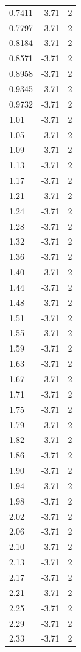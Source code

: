 \begin{longtable}{lrr}
  0.7411 & -3.71 & 2 \\
  0.7797 & -3.71 & 2 \\
  0.8184 & -3.71 & 2 \\
  0.8571 & -3.71 & 2 \\
  0.8958 & -3.71 & 2 \\
  0.9345 & -3.71 & 2 \\
  0.9732 & -3.71 & 2 \\
  1.01 & -3.71 & 2 \\
  1.05 & -3.71 & 2 \\
  1.09 & -3.71 & 2 \\
  1.13 & -3.71 & 2 \\
  1.17 & -3.71 & 2 \\
  1.21 & -3.71 & 2 \\
  1.24 & -3.71 & 2 \\
  1.28 & -3.71 & 2 \\
  1.32 & -3.71 & 2 \\
  1.36 & -3.71 & 2 \\
  1.40 & -3.71 & 2 \\
  1.44 & -3.71 & 2 \\
  1.48 & -3.71 & 2 \\
  1.51 & -3.71 & 2 \\
  1.55 & -3.71 & 2 \\
  1.59 & -3.71 & 2 \\
  1.63 & -3.71 & 2 \\
  1.67 & -3.71 & 2 \\
  1.71 & -3.71 & 2 \\
  1.75 & -3.71 & 2 \\
  1.79 & -3.71 & 2 \\
  1.82 & -3.71 & 2 \\
  1.86 & -3.71 & 2 \\
  1.90 & -3.71 & 2 \\
  1.94 & -3.71 & 2 \\
  1.98 & -3.71 & 2 \\
  2.02 & -3.71 & 2 \\
  2.06 & -3.71 & 2 \\
  2.10 & -3.71 & 2 \\
  2.13 & -3.71 & 2 \\
  2.17 & -3.71 & 2 \\
  2.21 & -3.71 & 2 \\
  2.25 & -3.71 & 2 \\
  2.29 & -3.71 & 2 \\
  2.33 & -3.71 & 2 \\

\end{longtable}
